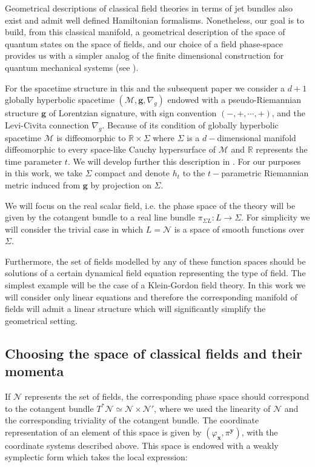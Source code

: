 \documentclass{elsarticle}%
\begin{document}
 Geometrical descriptions of classical field theories in terms of jet bundles also exist and admit  well defined Hamiltonian formalisms. Nonetheless, our goal is to build, from this classical manifold, a geometrical description of the space of quantum states on the space of fields, and our choice of a field phase-space provides us with a simpler analog of the finite dimensional construction for quantum mechanical systems (see \cite{kibbleGeometrizationQuantum1979}).

 

  For the spacetime structure in this and the subsequent paper we consider a $d+1$ globally hyperbolic spacetime $(\mathcal{M},\mathbf{g}, \nabla_g)$
 endowed with a pseudo-Riemannian structure $\mathbf{g}$ of Lorentzian 
signature, with sign convention  $(-,+,\cdots,+)$, and the Levi-Civita connection $\nabla_g$. Because of its condition of globally hyperbolic spacetime $\mathcal{M}$ is diffeomorphic to $\mathbb{R}\times\Sigma$ where $\Sigma$ is a $d-$dimensional manifold diffeomorphic
to every space-like Cauchy hypersurface of $\mathcal{M}$ and $\mathbb{R}$ represents the time parameter $t$. We will develop further this description in \cite{alonsoGeometricFlavours2024}. For our purposes in this work, we take $\Sigma$ compact and denote ${h}_t$ to the $t-$parametric 
 Riemannian metric induced from $\mathbf{g}$  by projection on $\Sigma$.
 

We will focus on the real scalar field, i.e. the phase space of the theory will be given by the cotangent bundle to a real line bundle $\pi_{\Sigma L}:L\to \Sigma$. For simplicity we will consider the trivial case in which $L=\mathcal{N}$ is a space of smooth functions over $\Sigma$.

Furthermore, the set of fields modelled by any of these function spaces should be solutions of a certain dynamical field equation representing the type of field. The simplest example will be the case of a Klein-Gordon field theory. In this work we will consider only linear equations and therefore the corresponding manifold of fields will admit a linear structure which will significantly simplify the geometrical setting. 

\subsection{Choosing the space of classical fields and their momenta}

If $\mathcal{N}$ represents the set of fields, the corresponding phase space should correspond to the cotangent bundle $T^*\mathcal{N}\simeq \mathcal{N}\times \mathcal{N}'$, where we used the linearity of $\mathcal{N}$ and the corresponding triviality of the cotangent bundle. The coordinate representation of an element of this space is given by $(\varphi_\mathbf{x},\pi^\mathbf{y})$, with the coordinate systems described above. This space is endowed with a weakly symplectic form  which takes the local expression:
\end{document}
